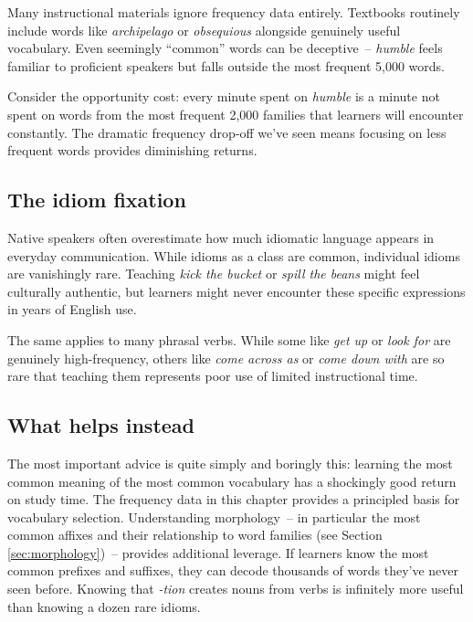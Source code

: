 Many instructional materials ignore frequency data entirely. Textbooks routinely include words like \textit{archipelago} or \textit{obsequious} alongside genuinely useful vocabulary. Even seemingly ``common'' words can be deceptive~-- \textit{humble} feels familiar to proficient speakers but falls outside the most frequent 5,000 words.

Consider the opportunity cost: every minute spent on \textit{humble} is a minute not spent on words from the most frequent 2,000 families that learners will encounter constantly. The dramatic frequency drop-off we've seen means focusing on less frequent words provides diminishing returns.

\subsection{The idiom fixation}

Native speakers often overestimate how much idiomatic language appears in everyday communication. While idioms as a class are common, individual idioms are vanishingly rare. Teaching \textit{kick the bucket} or \textit{spill the beans} might feel culturally authentic, but learners might never encounter these specific expressions in years of English use.

The same applies to many phrasal verbs. While some like \textit{get up} or \textit{look for} are genuinely high-frequency, others like \textit{come across as} or \textit{come down with} are so rare that teaching them represents poor use of limited instructional time.

\subsection{What helps instead}

The most important advice is quite simply and boringly this: learning the most common meaning of the most common vocabulary has a shockingly good return on study time. The frequency data in this chapter provides a principled basis for vocabulary selection.
Understanding morphology~-- in particular the most common affixes and their relationship to word families (see Section \ref{sec:morphology})~-- provides additional leverage. If learners know the most common prefixes and suffixes, they can decode thousands of words they've never seen before. Knowing that \textit{-tion} creates nouns from verbs is infinitely more useful than knowing a dozen rare idioms.

